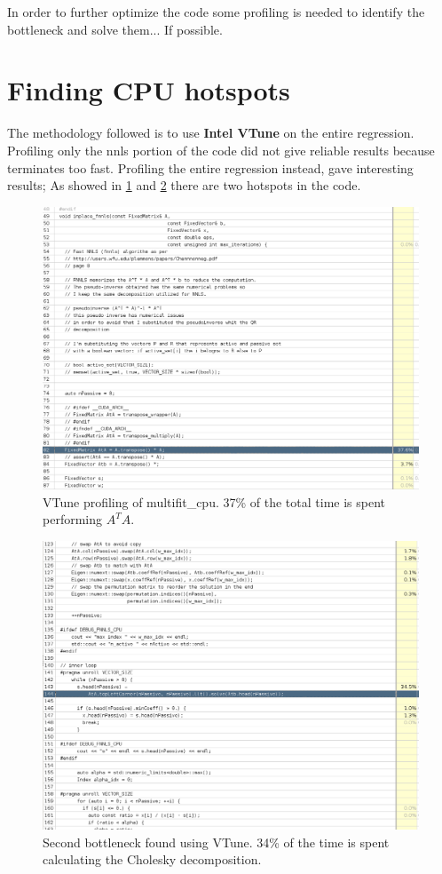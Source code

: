 In order to further optimize the code some profiling is needed to identify the bottleneck and solve them... If possible. \\
\section{Finding CPU hotspots}
The methodology followed is to use \textbf{Intel VTune} on the entire regression. Profiling only the nnls portion of the code did not give reliable results because terminates too fast. Profiling the entire regression instead, gave interesting results; As showed in \ref{img:vtune_eigen_01} and \ref{img:vtune_eigen_02} there are two hotspots in the code. \\
\begin{figure}[ht]
  \includegraphics[width=\textwidth]{img/vtune_eigen_01}
  \caption{VTune profiling of multifit\_cpu. 37\% of the total time is spent performing $A^TA$.}
  \label{img:vtune_eigen_01}
\end{figure}
\begin{figure}[ht]
  \includegraphics[width=\textwidth]{img/vtune_eigen_02}
  \caption{Second bottleneck found using VTune. 34\% of the time is spent calculating the Cholesky decomposition.}
  \label{img:vtune_eigen_02}
\end{figure}
